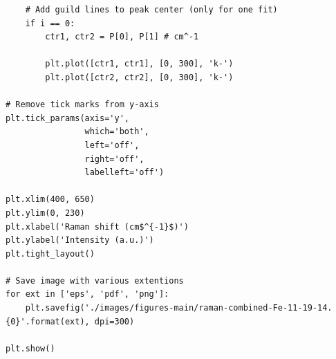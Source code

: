 \documentclass[journal=jpccck,manuscript=suppinfo,email=true]{achemso}
\begin{document}
\begin{verbatim}
    # Add guild lines to peak center (only for one fit)
    if i == 0:
        ctr1, ctr2 = P[0], P[1] # cm^-1

        plt.plot([ctr1, ctr1], [0, 300], 'k-')
        plt.plot([ctr2, ctr2], [0, 300], 'k-')

# Remove tick marks from y-axis
plt.tick_params(axis='y',
                which='both',
                left='off',
                right='off',
                labelleft='off')

plt.xlim(400, 650)
plt.ylim(0, 230)
plt.xlabel('Raman shift (cm$^{-1}$)')
plt.ylabel('Intensity (a.u.)')
plt.tight_layout()

# Save image with various extentions
for ext in ['eps', 'pdf', 'png']:
    plt.savefig('./images/figures-main/raman-combined-Fe-11-19-14.{0}'.format(ext), dpi=300)

plt.show()
\end{verbatim}
\end{document}
